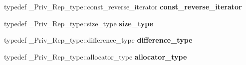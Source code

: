 \begin{DoxyCompactItemize}
typedef \+\_\+\+Priv\+\_\+\+Rep\+\_\+type\+::const\+\_\+reverse\+\_\+iterator {\bfseries const\+\_\+reverse\+\_\+iterator}
\item 
\mbox{\label{classset_acf9464d3c61c9d4e0bafe1a4cf647419}} 
typedef \+\_\+\+Priv\+\_\+\+Rep\+\_\+type\+::size\+\_\+type {\bfseries size\+\_\+type}
\item 
\mbox{\label{classset_a7d7fc553047a2983e909b72bed92bc71}} 
typedef \+\_\+\+Priv\+\_\+\+Rep\+\_\+type\+::difference\+\_\+type {\bfseries difference\+\_\+type}
\item 
\mbox{\label{classset_a111a86090800b3f9a0f0d70a31112732}} 
typedef \+\_\+\+Priv\+\_\+\+Rep\+\_\+type\+::allocator\+\_\+type {\bfseries allocator\+\_\+type}
\end{DoxyCompactItemize}
